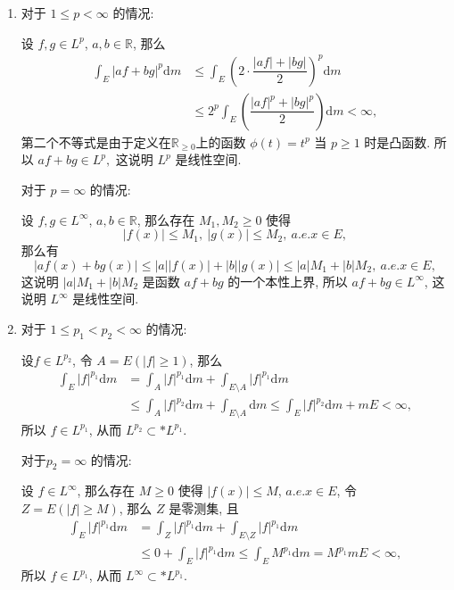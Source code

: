 \begin{solution}
  \begin{enumerate}
    \item 对于 \(1 \leqslant p < \infty\) 的情况: 

    设 \(f, g \in L^p\), \(a, b \in \mathbb{R}\), 那么
    \[\begin{aligned}
    \int_E \lvert af + bg \rvert^p \mathrm{d} m & \leqslant \int_E \left( 2 \cdot \dfrac{\lvert af \rvert + \lvert bg \rvert}{2} \right)^p \mathrm{d} m \\
    & \leqslant 2^p \int_E \left( \dfrac{\lvert af \rvert^p + \lvert bg \rvert^p}{2} \right) \mathrm{d} m < \infty,
    \end{aligned}\]
    第二个不等式是由于定义在\(\mathbb{R}_{\geqslant 0}\)上的函数 \(\phi(t) = t^p\) 当 \(p \geqslant 1\) 时是凸函数. 所以 \(af + bg \in L^p,\) 这说明 \(L^p\) 是线性空间.

    对于 \(p = \infty\) 的情况: 

    设 \(f, g \in L^\infty\), \(a, b \in \mathbb{R}\), 那么存在 \(M_1, M_2 \geqslant 0\) 使得
    \[\lvert f(x) \rvert \leqslant M_1, ~ \lvert g(x) \rvert \leqslant M_2, ~ a.e. x \in E,\]
    那么有
    \[\lvert af(x) + bg(x) \rvert \leqslant \lvert a \rvert \lvert f(x) \rvert + \lvert b \rvert \lvert g(x) \rvert \leqslant \lvert a \rvert M_1 + \lvert b \rvert M_2, ~ a.e. x \in E,\]
    这说明 \(\lvert a \rvert M_1 + \lvert b \rvert M_2\) 是函数 \(af + bg\) 的一个本性上界, 所以 \(af + bg \in L^\infty\), 这说明 \(L^\infty\) 是线性空间.
    \item 对于 \(1 \leqslant p_1 < p_2 < \infty\) 的情况: 

    设\(f \in L^{p_2}\), 令 \(A = E(\lvert f \rvert \geqslant 1)\), 那么
    \[\begin{aligned}
    \int_E \lvert f \rvert^{p_1} \mathrm{d} m & = \int_A \lvert f \rvert^{p_1} \mathrm{d} m + \int_{E \setminus A} \lvert f \rvert^{p_1} \mathrm{d} m \\
    & \leqslant \int_A \lvert f \rvert^{p_2} \mathrm{d} m + \int_{E \setminus A} \mathrm{d} m \leqslant \int_E \lvert f \rvert^{p_2} \mathrm{d} m + m E < \infty,
    \end{aligned}\]
    所以 \(f \in L^{p_1}\), 从而 \(L^{p_2} \subset* L^{p_1}\).

    对于\(p_2 = \infty\) 的情况: 

    设 \(f \in L^\infty\), 那么存在 \(M \geqslant 0\) 使得 \(\lvert f(x) \rvert \leqslant M\), \(a.e. x \in E\), 令 \(Z = E(\lvert f \rvert \geqslant M)\), 那么 \(Z\) 是零测集, 且
    \[\begin{aligned}
    \int_E \lvert f \rvert^{p_1} \mathrm{d} m & = \int_Z \lvert f \rvert^{p_1} \mathrm{d} m + \int_{E \setminus Z} \lvert f \rvert^{p_1} \mathrm{d} m \\
    & \leqslant 0 + \int_E \lvert f \rvert^{p_1} \mathrm{d} m \leqslant \int_E M^{p_1} \mathrm{d} m = M^{p_1} m E < \infty,
    \end{aligned}\]
    所以 \(f \in L^{p_1}\), 从而 \(L^\infty \subset* L^{p_1}\).
  \end{enumerate}
\end{solution}

